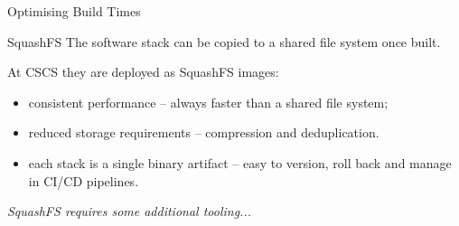 \documentclass[aspectratio=43]{beamer}
\begin{document}
\begin{frame}[fragile]{Optimising Build Times}
    \begin{center}
        
    \end{center}
\end{frame}



\begin{frame}[fragile]{SquashFS}
    The software stack can be copied to a shared file system once built.

    \vspace{20pt}

    At CSCS they are deployed as SquashFS images:
    \begin{itemize}
        \item consistent performance -- always faster than a shared file system;
        \item reduced storage requirements -- compression and deduplication.
        \item each stack is a single binary artifact -- easy to version, roll back and manage in CI/CD pipelines.
    \end{itemize}

    \vspace{20pt}

    \begin{center}
    \emph{SquashFS requires some additional tooling...}
    \end{center}
\end{frame}
\end{document}
